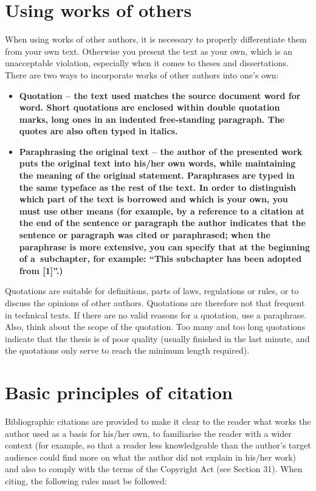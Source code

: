 \section{Using works of others}

When using works of other authors, it is necessary to properly differentiate them from your own text. Otherwise you present the text as your own, which is an unacceptable violation, especially when it comes to theses and dissertations. There are two ways to incorporate works of other authors into one's own:

\begin{itemize}
  \item{\bf Quotation \rm -- the text used matches the source document word for word. Short quotations are enclosed within double quotation marks, long ones in an indented free-standing paragraph. 
The quotes are also often typed in italics.}
  \item{\bf Paraphrasing the original text \rm -- the author of the presented work puts the original text into his/her own words, while maintaining the meaning of the original statement. Paraphrases are typed in the same typeface as the rest of the text. In order to distinguish which part of the text is borrowed and which is your own, you must use other means (for example, by a reference to a citation at the end of the sentence or paragraph the author indicates that the sentence or paragraph was cited or paraphrased; when the paraphrase is more extensive, you can specify that at the beginning of a~subchapter, for example: ``This subchapter has been adopted from [1]''.)} 
\end{itemize}

Quotations are suitable for definitions, parts of laws, regulations or rules, or to discuss the opinions of other authors. Quotations are therefore not that frequent in technical texts. If there are no valid reasons for a quotation, use a paraphrase. Also, think about the scope of the quotation. Too many and too long quotations indicate that the thesis is of poor quality (usually finished in the last minute, and the quotations only serve to reach the minimum length required).

\section{Basic principles of citation}

Bibliographic citations are provided to make it clear to the reader what works the author used as a basis for his/her own, to familiarise the reader with a wider context (for example, 
so that a reader less knowledgeable than the author's target audience could find more on what the author did not explain in his/her work) and also to comply with the terms of the 
Copyright Act (see Section 31). When citing, the following rules must be followed:

